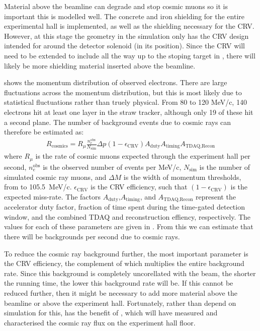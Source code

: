 Material above the beamline can degrade and stop cosmic muons so it is important this is modelled well.
The concrete and iron shielding for the entire experimental hall is implemented, as well as the shielding necessary for the \ac{CRV}.
However, at this stage the geometry in the simulation only has the CRV design intended for \phaseI around the detector solenoid (in its \phaseII position).
Since the CRV will need to be extended to include all the way up to the stoping target in \phaseII, there will likely be more shielding material inserted above the beamline.

 shows the momentum distribution of observed electrons.  
There are large fluctuations across the momentum distribution, but this is most likely due to statistical fluctuations rather than truely physical.
From 80 to 120 MeV/c, 140 electrons hit at least one layer in the straw tracker, although only 19 of these hit a second plane.
The number of background events due to cosmic rays can therefore be estimated as:
\begin{align}
	R_\textrm{cosmics}=R_\mu\frac{n_e^\textrm{obs}}{N_\textrm{sim}} \Delta{}p (1-\epsilon_\textrm{CRV}) A_\textrm{duty}A_\textrm{timing}A_\textrm{TDAQ,Recon}
\end{align}
where $R_\mu$ is the rate of cosmic muons expected through the experiment hall per second, $n_e^\textrm{obs}$ is the observed number of events per MeV/c, $N_\textrm{sim}$ is the number of simulated cosmic ray muons, and $\Delta{}M$ is the width of momentum thresholds, from \VarMomThreshold to 105.5~MeV/c.
$\epsilon_\textrm{CRV}$ is the \ac{CRV} efficiency, such that $(1-\epsilon_\textrm{CRV})$ is the expected miss-rate. 
The factors $A_\textrm{duty}$,$A_\textrm{timing}$, and $A_\textrm{TDAQ,Recon}$ represent the accelerator duty factor, fraction of time spent during the time-gated detection window, and the combined TDAQ and reconstruction effiency, respectively.  
The values for each of these parameters are given in .
From this we can estimate that there will be \VarCosmicRatePerSecond backgrounds per second due to cosmic rays.
\TabBgCosmicParameters

To reduce the cosmic ray background further, the most important parameter is the \ac{CRV} efficiency, the complement of which multiplies the entire background rate.
Since this background is completely uncorellated with the beam, the shorter the running time, the lower this background rate will be.
If this cannot be reduced further, then it might be necessary to add more material above the beamline or above the experiment hall.
Fortunately, rather than depend on simulation for this, \phaseII has the benefit of \phaseI, which will have measured and characterised the cosmic ray flux on the experiment hall floor.

